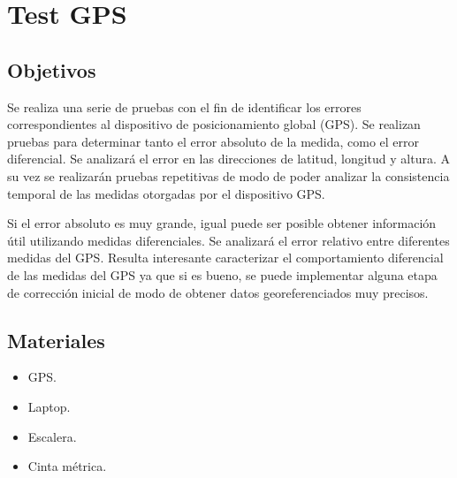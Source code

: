 \documentclass[spanish,12pt,a4paper,titlepage]{report}
\begin{document}
\chapter{Test GPS}

\section{Objetivos}

Se realiza una serie de pruebas con el fin de identificar los errores correspondientes al dispositivo de posicionamiento global (GPS). Se realizan pruebas para determinar tanto el error absoluto de la medida, como el error diferencial. Se analizará el error en las direcciones de latitud, longitud y altura. A su vez se realizarán pruebas repetitivas de modo de poder analizar la consistencia temporal de las medidas otorgadas por el dispositivo GPS.

Si el error absoluto es muy grande, igual puede ser posible obtener información útil utilizando medidas diferenciales. Se analizará el error relativo entre diferentes medidas del GPS. Resulta interesante caracterizar el comportamiento diferencial de las medidas del GPS ya que si es bueno, se puede implementar alguna etapa de corrección inicial de modo de obtener datos georeferenciados muy precisos.

%
%

\section{Materiales}

\begin{itemize}
\item GPS.
\item Laptop.
\item Escalera.
\item Cinta métrica.
\end{itemize}
\end{document}
